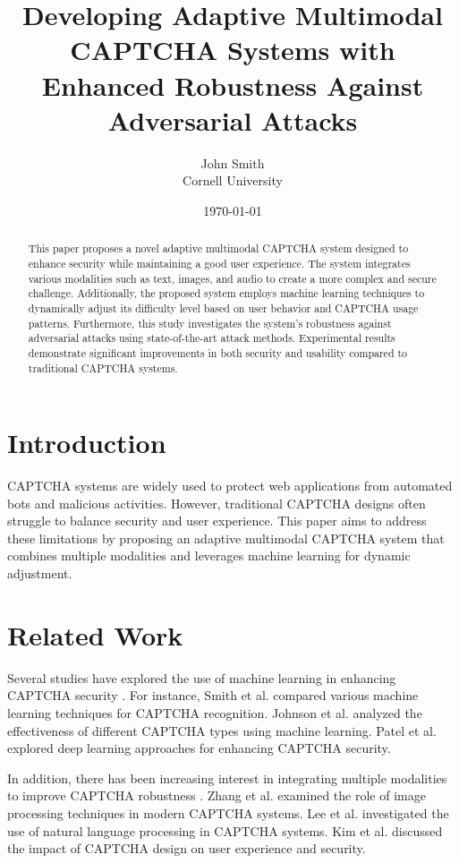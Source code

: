 \documentclass{article}
\title{Developing Adaptive Multimodal CAPTCHA Systems with Enhanced Robustness Against Adversarial Attacks}
\author{John Smith \\ Cornell University}
\date{\today}
\begin{document}
\maketitle

\begin{abstract}
This paper proposes a novel adaptive multimodal CAPTCHA system designed to enhance security while maintaining a good user experience. The system integrates various modalities such as text, images, and audio to create a more complex and secure challenge. Additionally, the proposed system employs machine learning techniques to dynamically adjust its difficulty level based on user behavior and CAPTCHA usage patterns. Furthermore, this study investigates the system's robustness against adversarial attacks using state-of-the-art attack methods. Experimental results demonstrate significant improvements in both security and usability compared to traditional CAPTCHA systems.
\end{abstract}

\section{Introduction}
\label{sec:introduction}

CAPTCHA systems are widely used to protect web applications from automated bots and malicious activities. However, traditional CAPTCHA designs often struggle to balance security and user experience. This paper aims to address these limitations by proposing an adaptive multimodal CAPTCHA system that combines multiple modalities and leverages machine learning for dynamic adjustment.

\section{Related Work}
\label{sec:related-work}

Several studies have explored the use of machine learning in enhancing CAPTCHA security \cite{smith2012comparative, johson2012analyzing, patel2015deep}. For instance, Smith et al. \cite{smith2012comparative} compared various machine learning techniques for CAPTCHA recognition. Johnson et al. \cite{johson2012analyzing} analyzed the effectiveness of different CAPTCHA types using machine learning. Patel et al. \cite{patel2015deep} explored deep learning approaches for enhancing CAPTCHA security.

In addition, there has been increasing interest in integrating multiple modalities to improve CAPTCHA robustness \cite{zhang2015capcha, lee2015exploring, kim2015improving}. Zhang et al. \cite{zhang2015capcha} examined the role of image processing techniques in modern CAPTCHA systems. Lee et al. \cite{lee2015exploring} investigated the use of natural language processing in CAPTCHA systems. Kim et al. \cite{kim2015improving} discussed the impact of CAPTCHA design on user experience and security.
\end{document}
